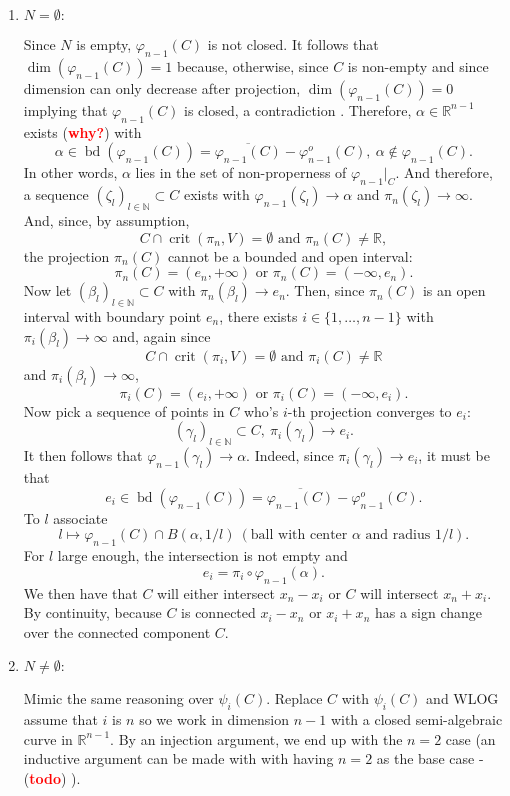 \documentclass[11pt]{article}
\theoremstyle{definition}
\newcommand{\N}{\mathbb{N}}
\newcommand{\R}{\mathbb{R}}
\newcommand{\vp}{\varphi}
\def\td{(\textcolor{red}{{\bf todo}})}
\def\td{(\textcolor{red}{{\bf todo}}) }
\def\why{(\textcolor{red}{{\bf why?}}) }
\DeclareMathOperator{\bd}{bd}
\DeclareMathOperator{\crit}{crit}
\begin{document}
\begin{enumerate}
    \item $N = \emptyset:$ 
    \par 
    Since $N$ is empty, $\vp_{n-1}(C)$ is not closed. It follows that $\dim(\vp_{n-1}(C))=1$ because, otherwise, since $C$ is non-empty  and since dimension can only decrease after projection, $\dim(\vp_{n-1}(C))=0$ implying that $\vp_{n-1}(C)$ is closed, a contradiction \lightning. Therefore, $\alpha \in \R^{n-1}$ exists \why with 
    \[
    \alpha \in \bd(\vp_{n-1}(C)) = \overline{\vp_{n-1}(C)} - \vp_{n-1}^o(C),~ \alpha \not \in \vp_{n-1}(C).
    \]
    In other words, $\alpha$ lies in the set of non-properness of $\vp_{n-1}|_C$. And therefore, a sequence $(\zeta_l)_{l \in \N} \subset C$ exists with $\vp_{n-1}(\zeta_l) \rightarrow \alpha$ and $\pi_n(\zeta_l) \rightarrow \infty.$ And, since, by assumption, 
\[
    C \cap \crit(\pi_n,V) = \emptyset \textrm{ and  } \pi_n(C) \not = \R,
\]
the projection $\pi_n(C)$ cannot be a bounded and open interval:
\[
\pi_n(C) = (e_n,+\infty) \textrm{ or } \pi_n(C) = (-\infty,e_n). 
\]
Now let $(\beta_l)_{l \in \N} \subset C$ with $\pi_n(\beta_l) \rightarrow e_n$. Then, since $\pi_n(C)$ is an open interval with boundary point $e_n$, there exists $i \in \{1,\hdots,n-1\}$ with $\pi_i(\beta_l) \rightarrow \infty$ and, again since \[
    C \cap \crit(\pi_i,V) = \emptyset \textrm{ and  } \pi_i(C) \not = \R
\]
and $\pi_i(\beta_l) \rightarrow \infty$,
\[
\pi_i(C) = (e_i,+\infty) \textrm{ or } \pi_i(C) = (-\infty,e_i). 
\]
Now pick a sequence of points in $C$ who's $i$-th projection converges to $e_i:$ 
\[
(\gamma_l)_{l \in \N} \subset C,~ \pi_i(\gamma_l) \rightarrow e_i.
\]
It then follows that $\vp_{n-1}(\gamma_l) \rightarrow \alpha$. Indeed, since $\pi_i(\gamma_l) \rightarrow e_i$, it must be that 
\[
e_i \in \bd(\vp_{n-1}(C)) = \overline{\vp_{n-1}(C)} - \vp_{n-1}^o(C).
\]
To $l$ associate 
\[
l \mapsto \vp_{n-1}(C) \cap B(\alpha,1/l)~(\textrm{ball with center }\alpha \textrm{ and radius } 1/l).
\]
For $l$ large enough, the intersection is not empty and
\[
e_i =\pi_i\circ \vp_{n-1}(\alpha).
\]
We then have that $C$ will either intersect $x_n-x_i$ or $C$ will intersect $x_n+x_i$. By continuity, because $C$ is connected $x_i - x_n$ or $x_i+x_n$ has a sign change over the connected component $C$. 
%
\item $N \not = \emptyset:$
\par 
Mimic the same reasoning over $\psi_i(C)$. Replace $C$ with $\psi_i(C)$ and WLOG assume that $i$ is $n$ so we work in dimension $n-1$ with a closed semi-algebraic curve in $\R^{n-1}$. By an injection argument, we end up with the $n=2$ case (an inductive argument can be made with with having $n=2$ as the base case - \td).  
\end{enumerate}
\end{document}
